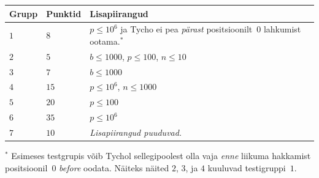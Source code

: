 \medskip
\begin{tabular}{lll}
Grupp & Punktid & Lisapiirangud \\\hline
  $1$ & $8$  & $p\leq 10^6$ ja Tycho ei pea \emph{pärast} positsioonilt~$0$ lahkumist ootama.$^*$ \\ %
  $2$ & $5$  & $b\leq 1000$, $p\leq 100$, $n\leq 10$ \\
  $3$ & $7$  & $b\leq 1000$ \\
  $4$ & $15$ & $p\leq 10^6$, $n\leq 1000$\\
  $5$ & $20$ & $p\leq 100$\\
  $6$ & $35$ & $p\leq 10^6$\\
  $7$ & $10$ & \emph{Lisapiirangud puuduvad.}
\end{tabular}

\medskip
\noindent $^*$ Esimeses testgrupis võib Tychol sellegipoolest olla vaja \emph{enne} liikuma hakkamist positsioonil~$0$ \emph{before} oodata.
Näiteks näited $2$, $3$, ja $4$ kuuluvad testigruppi~$1$.
